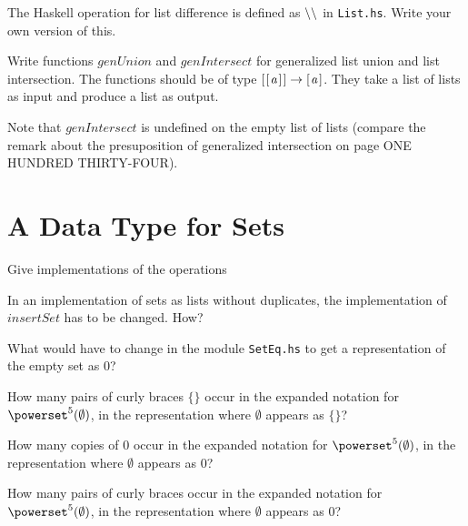 \documentclass{report}
\newcommand{\Varid}[1]{\mathit{#1}}
\begin{document}
\begin{Exercise} [number=51]
  The Haskell operation for list difference is defined as \ensuremath{\mathbin{\char92 \char92 }} in
  \texttt{List.hs}. Write your own version of this.
\end{Exercise}

\begin{Exercise} [number=53]
  Write functions \ensuremath{\Varid{genUnion}} and \ensuremath{\Varid{genIntersect}} for generalized list
  union and list intersection. The functions should be of type
  \ensuremath{[\mskip1.5mu [\mskip1.5mu \Varid{a}\mskip1.5mu]\mskip1.5mu]\to [\mskip1.5mu \Varid{a}\mskip1.5mu]}. They take a list of lists as input and produce a
  list as output.

  Note that \ensuremath{\Varid{genIntersect}} is undefined on the empty
  list of lists (compare the remark about the presuposition of
  generalized intersection on page ONE HUNDRED THIRTY-FOUR).
\end{Exercise}
\section{A Data Type for Sets}

\begin{Exercise} [number=54]
  Give implementations of the operations %
\end{Exercise}

\begin{Exercise} [number=55]
  In an implementation of sets as lists without duplicates, the
  implementation of \ensuremath{\Varid{insertSet}} has to be changed. How?
\end{Exercise}

\begin{Exercise} [number=56]
  What would have to change in the module \texttt{SetEq.hs} to get a
  representation of the empty set as $0$?
\end{Exercise}

\begin{Exercise} [number=57,difficulty=1]
  \Question How many pairs of curly braces $\lbrace \rbrace$ occur in
  the expanded notation for $\powerset^5(\emptyset)$, in the
  representation where $\emptyset$ appears as $\{\}$?

  \Question How many copies of $0$ occur in the expanded notation for
  $\powerset^5(\emptyset)$, in the representation where $\emptyset$
  appears as 0?

  \Question
  How many pairs of curly braces occur in the expanded notation for
  $\powerset^5(\emptyset)$, in the representation where $\emptyset$
  appears as 0?
\end{Exercise}
\end{document}
